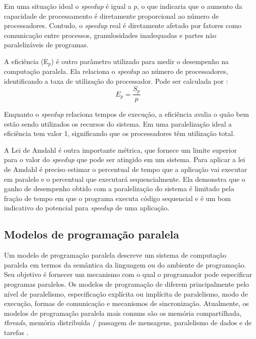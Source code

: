 Em uma situação ideal o \textit{speedup} é igual a $p$, o que indicaria que o aumento da capacidade de processamento é diretamente proporcional ao número de processadores. 
Contudo,  o \textit{speedup} real é diretamente afetado por fatores como comunicação entre processos, granulosidades inadequadas e partes não paralelizáveis de programas.

A eficiência (E$_p$) é outro parâmetro utilizado para medir o desempenho na computação paralela.  Ela relaciona o \textit{speedup} ao número de processadores, identificando a taxa de utilização do processador. Pode ser calculada por \cite{Rauber:2010}: 
 \[ E_p = \frac{S_p}{p} \]
 
Enquanto o \textit{speedup} relaciona tempos de execução, a eficiência avalia o quão bem estão sendo utilizados os recursos do sistema. Em uma paralelização ideal a eficiência tem valor 1, significando que os processadores têm utilização total.
		
A Lei de Amdahl  é outra importante métrica, que fornece um limite superior para o valor do \textit{speedup} que pode ser atingido em um sistema. Para aplicar a lei de Amdahl é preciso estimar o percentual de tempo que a aplicação vai executar em paralelo e   o percentual que executará sequencialmente. 
Ela demonstra que o ganho de desempenho obtido com a paralelização do sistema é limitado pela fração de tempo em que o programa executa código sequencial e é um bom indicativo do potencial para \textit{speedup} de uma aplicação.


\subsection{Modelos de programação paralela}

Um modelo de programação paralela descreve um sistema de computação paralela em termos da semântica da linguagem ou do ambiente de programação. Seu objetivo é fornecer um mecanismo com o qual o programador pode especificar programas paralelos. Os modelos de programação de diferem principalmente pelo nível de paralelismo, especificação explícita ou implícita de paralelismo, modo de execução, formas de comunicação e mecanismos de sincronização. Atualmente, os modelos de programação paralela mais comuns são os memória compartilhada, \textit{threads}, memória distribuída / passagem de mensagens, paralelismo de dados e de tarefas \cite{Rauber:2010}.
 


